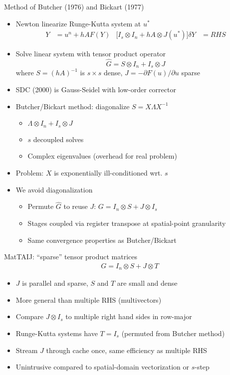 \documentclass{beamer}
\begin{document}
\begin{frame}{Method of Butcher (1976) and Bickart (1977)}
  \begin{itemize}
  \item Newton linearize Runge-Kutta system at $u^*$
    \begin{align*}
      Y &= u^{n} + h A F(Y) & \big[ I_s \otimes I_n + h A \otimes J(u^*)\big ] \delta Y &= RHS
    \end{align*}
  \item Solve linear system with tensor product operator
    \begin{equation*}
      \hat G = S \otimes I_n + I_s \otimes J
    \end{equation*}
    where $S = (hA)^{-1}$ is $s\times s$ dense, $J = -\partial F(u)/\partial u$ sparse
  \item SDC (2000) is Gauss-Seidel with low-order corrector
  \item Butcher/Bickart method: diagonalize $S = X \Lambda X^{-1}$
    \begin{itemize}
    \item $\Lambda \otimes I_n + I_s \otimes J$
    \item $s$ decoupled solves
    \item Complex eigenvalues (overhead for real problem)
    \end{itemize}
  \item Problem: $X$ is exponentially ill-conditioned wrt. $s$
  \item We avoid diagonalization
    \begin{itemize}
    \item Permute $\hat G$ to reuse $J$: $G = I_n \otimes S + J \otimes I_s$
    \item Stages coupled via register transpose at spatial-point granularity
    \item Same convergence properties as Butcher/Bickart
    \end{itemize}
  \end{itemize}
\end{frame}
\begin{frame}{MatTAIJ: ``sparse'' tensor product matrices}
  \begin{gather*}
    G = I_n \otimes S + J \otimes T
  \end{gather*}
  \begin{itemize}
  \item $J$ is parallel and sparse, $S$ and $T$ are small and dense
  \item More general than multiple RHS (multivectors)
  \item Compare $J \otimes I_s$ to multiple right hand sides in row-major
  \item Runge-Kutta systems have $T = I_s$ (permuted from Butcher method)
  \item Stream $J$ through cache once, same efficiency as multiple RHS
  \item Unintrusive compared to spatial-domain vectorization or $s$-step
  \end{itemize}
\end{frame}
\end{document}

